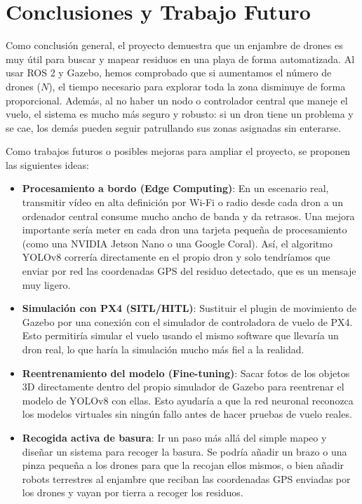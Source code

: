\documentclass[11pt,a4paper]{article}
\begin{document}
\section{Conclusiones y Trabajo Futuro}
Como conclusión general, el proyecto demuestra que un enjambre de drones es muy útil para buscar y mapear residuos en una playa de forma automatizada. Al usar ROS 2 y Gazebo, hemos comprobado que si aumentamos el número de drones ($N$), el tiempo necesario para explorar toda la zona disminuye de forma proporcional. Además, al no haber un nodo o controlador central que maneje el vuelo, el sistema es mucho más seguro y robusto: si un dron tiene un problema y se cae, los demás pueden seguir patrullando sus zonas asignadas sin enterarse.

Como trabajos futuros o posibles mejoras para ampliar el proyecto, se proponen las siguientes ideas:
\begin{itemize}
    \item \textbf{Procesamiento a bordo (Edge Computing)}: En un escenario real, transmitir vídeo en alta definición por Wi-Fi o radio desde cada dron a un ordenador central consume mucho ancho de banda y da retrasos. Una mejora importante sería meter en cada dron una tarjeta pequeña de procesamiento (como una NVIDIA Jetson Nano o una Google Coral). Así, el algoritmo YOLOv8 correría directamente en el propio dron y solo tendríamos que enviar por red las coordenadas GPS del residuo detectado, que es un mensaje muy ligero.
    \item \textbf{Simulación con PX4 (SITL/HITL)}: Sustituir el plugin de movimiento de Gazebo por una conexión con el simulador de controladora de vuelo de PX4. Esto permitiría simular el vuelo usando el mismo software que llevaría un dron real, lo que haría la simulación mucho más fiel a la realidad.
    \item \textbf{Reentrenamiento del modelo (Fine-tuning)}: Sacar fotos de los objetos 3D directamente dentro del propio simulador de Gazebo para reentrenar el modelo de YOLOv8 con ellas. Esto ayudaría a que la red neuronal reconozca los modelos virtuales sin ningún fallo antes de hacer pruebas de vuelo reales.
    \item \textbf{Recogida activa de basura}: Ir un paso más allá del simple mapeo y diseñar un sistema para recoger la basura. Se podría añadir un brazo o una pinza pequeña a los drones para que la recojan ellos mismos, o bien añadir robots terrestres al enjambre que reciban las coordenadas GPS enviadas por los drones y vayan por tierra a recoger los residuos.
\end{itemize}
\end{document}
